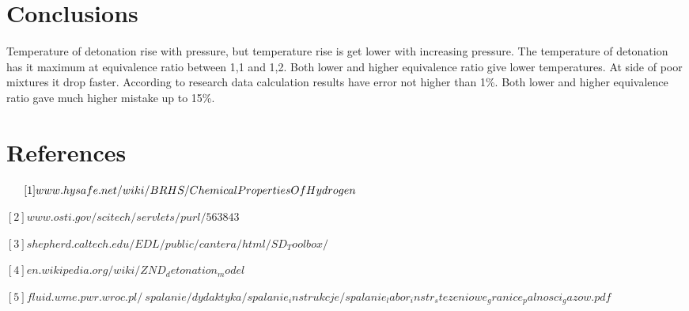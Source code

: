 \documentclass[a4paper]{article}
\begin{document}
\section{Conclusions}
Temperature of detonation rise with pressure, but temperature rise is get lower with increasing pressure. \newline The temperature of detonation has it maximum at equivalence ratio between 1,1 and 1,2. Both lower and higher equivalence ratio give lower temperatures. At side of poor mixtures it drop faster.\newline
According to research data calculation results have error not higher than 1\%. Both lower and higher equivalence ratio gave much higher mistake up to 15\%.

\section{References}

$
\hspace{5,35mm}[1] 
www.hysafe.net/wiki/BRHS/ChemicalPropertiesOfHydrogen
$

$
[2] www.osti.gov/scitech/servlets/purl/563843
$

$
[3] shepherd.caltech.edu/EDL/public/cantera/html/SD_Toolbox/
$

$
[4] en.wikipedia.org/wiki/ZND_detonation_model
$

$
[5] fluid.wme.pwr.wroc.pl/~spalanie/dydaktyka/spalanie_instrukcje/spalanie_labor_instr_stezeniowe_granice_palnosci_gazow.pdf
$
\end{document}
